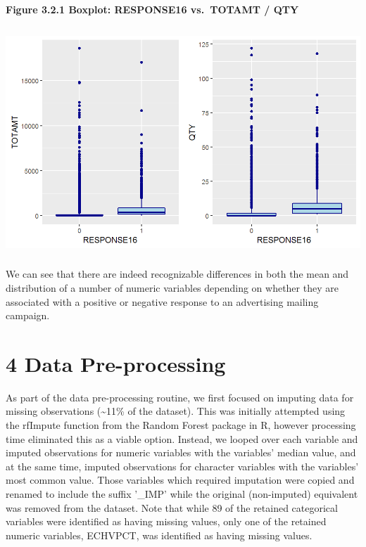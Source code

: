 \documentclass[]{article}
\let\oldparagraph\paragraph
\renewcommand{\paragraph}[1]{\oldparagraph{#1}\mbox{}}
\begin{document}
\paragraph{Figure 3.2.1 Boxplot: RESPONSE16 vs.~TOTAMT /
QTY}\label{figure-3.2.1-boxplot-response16-vs.totamt-qty}

\includegraphics[height=3.33333in]{images/expl_boxcomp_1.png}

We can see that there are indeed recognizable differences in both the
mean and distribution of a number of numeric variables depending on
whether they are associated with a positive or negative response to an
advertising mailing campaign.

\section{4 Data Pre-processing}\label{data-pre-processing}

As part of the data pre-processing routine, we first focused on imputing
data for missing observations (\textasciitilde{}11\% of the dataset).
This was initially attempted using the rfImpute function from the Random
Forest package in R, however processing time eliminated this as a viable
option. Instead, we looped over each variable and imputed observations
for numeric variables with the variables' median value, and at the same
time, imputed observations for character variables with the variables'
most common value. Those variables which required imputation were copied
and renamed to include the suffix '\_IMP' while the original
(non-imputed) equivalent was removed from the dataset. Note that while
89 of the retained categorical variables were identified as having
missing values, only one of the retained numeric variables, ECHVPCT, was
identified as having missing values.
\end{document}
